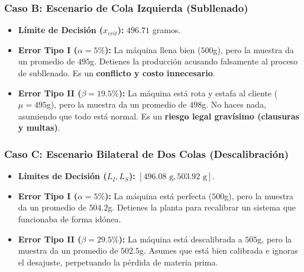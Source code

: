 \documentclass{article}
\begin{document}
\subsubsection{Caso B: Escenario de Cola Izquierda (Subllenado)}
\begin{itemize}
    \item \textbf{Límite de Decisión ($x_{crit}$):} $496.71$ gramos.
    \item \textbf{Error Tipo I ($\alpha = 5\%$):} La máquina llena bien ($500$g), pero la muestra da un promedio de $495$g. Detienes la producción acusando falsamente al proceso de subllenado. Es un \textbf{conflicto y costo innecesario}.
    \item \textbf{Error Tipo II ($\beta = 19.5\%$):} La máquina está rota y estafa al cliente ($\mu = 495$g), pero la muestra da un promedio de $498$g. No haces nada, asumiendo que todo está normal. Es un \textbf{riesgo legal gravísimo (clausuras y multas)}.
\end{itemize}

\subsubsection{Caso C: Escenario Bilateral de Dos Colas (Descalibración)}
\begin{itemize}
    \item \textbf{Límites de Decisión ($L_I, L_S$):} $[496.08\text{ g}, 503.92\text{ g}]$.
    \item \textbf{Error Tipo I ($\alpha = 5\%$):} La máquina está perfecta ($500$g), pero la muestra da un promedio de $504.2$g. Detienes la planta para recalibrar un sistema que funcionaba de forma idónea.
    \item \textbf{Error Tipo II ($\beta = 29.5\%$):} La máquina está descalibrada a $505$g, pero la muestra da un promedio de $502.5$g. Asumes que está bien calibrada e ignoras el desajuste, perpetuando la pérdida de materia prima.
\end{itemize}
\end{document}
